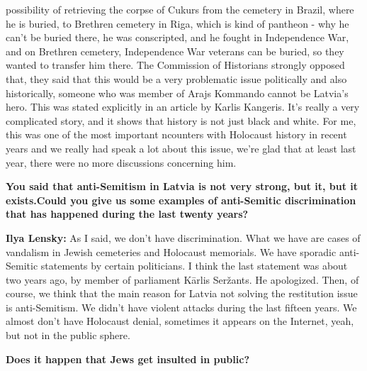 possibility of retrieving the corpse of Cukurs from the cemetery in Brazil, where he is buried, to Brethren cemetery in Riga, which is kind of pantheon - why he can't be buried there, he was conscripted, and he fought in Independence War,  and on Brethren cemetery, Independence War veterans can be buried, so they wanted to transfer him there. The Commission of Historians strongly opposed that, they said that this would be a very problematic issue politically and also historically, someone who was member of Arajs Kommando cannot be Latvia's hero. This was stated explicitly in an article by Karlis Kangeris. It's really a very complicated story, and it shows that history is not just black and white. For me, this was one of the most important ncounters with Holocaust history in recent years and we really had speak a lot about this issue, we’re glad that at least last year, there were no more discussions concerning him. 

\textbf{You said that anti-Semitism in Latvia is not very strong, but it, but it exists.Could you give us some examples of anti-Semitic discrimination that has happened during the last twenty years?} 

\textbf{Ilya Lensky:} As I said, we don’t have discrimination. What we have are cases of vandalism in Jewish cemeteries and Holocaust memorials. We have sporadic anti-Semitic statements by certain politicians. I think the last statement was about two years ago, by member of parliament Kārlis Seržants. He apologized. Then, of course, we think that the main reason for Latvia not solving the restitution issue is anti-Semitism. We didn’t have violent attacks during the last fifteen years. We almost don’t have Holocaust denial, sometimes it appears on the Internet, yeah, but not in the public sphere.

\textbf{Does it happen that Jews get insulted in public?} 

